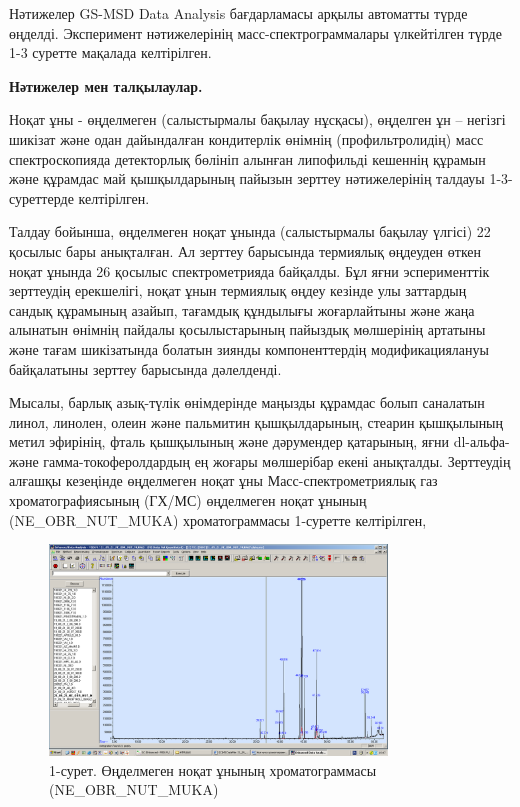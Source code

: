 Нәтижелер GS-MSD Data Analysis бағдарламасы арқылы автоматты түрде
өңделді. Эксперимент нәтижелерінің масс-спектрограммалары үлкейтілген
түрде 1-3 суретте мақалада келтірілген.

{\bfseries Нәтижелер мен талқылаулар.}

Ноқат ұны - өңделмеген (салыстырмалы бақылау нұсқасы), өңделген ұн --
негізгі шикізат және одан дайындалған кондитерлік өнімнің
(профильтролидің) масс спектроскопияда детекторлық бөлініп алынған
липофильді кешеннің құрамын және құрамдас май қышқылдарының пайызын
зерттеу нәтижелерінің талдауы 1-3-суреттерде келтірілген.

Талдау бойынша, өңделмеген ноқат ұнында (салыстырмалы бақылау үлгісі) 22
қосылыс бары анықталған. Ал зерттеу барысында термиялық өңдеуден өткен
ноқат ұнында 26 қосылыс спектрометрияда байқалды. Бұл яғни эсперименттік
зерттеудің ерекшелігі, ноқат ұнын термиялық өңдеу кезінде улы заттардың
сандық құрамының азайып, тағамдық құндылығы жоғарлайтыны және жаңа
алынатын өнімнің пайдалы қосылыстарының пайыздық мөлшерінің артатыны
және тағам шикізатында болатын зиянды компоненттердің модификациялануы
байқалатыны зерттеу барысында дәлелденді.

Мысалы, барлық азық-түлік өнімдерінде маңызды құрамдас болып саналатын
линол, линолен, олеин және пальмитин қышқылдарының, стеарин қышқылының
метил эфирінің, фталь қышқылының және дәрумендер қатарының, яғни
dl-альфа- және гамма-токоферолдардың ең жоғары мөлшерібар екені
анықталды. Зерттеудің алғашқы кезеңінде өңделмеген ноқат ұны
Масс-спектрометриялық газ хроматографиясының (ГХ/МС) өңделмеген ноқат
ұнының (NE\_OBR\_NUT\_MUKA) хроматограммасы 1-суретте келтірілген,

\begin{figure}[H]
	\centering
	\includegraphics[width=0.8\textwidth]{media/pish/image13}
	\caption*{1-сурет. Өңделмеген ноқат ұнының хроматограммасы
	(NE\_OBR\_NUT\_MUKA)}
\end{figure}



